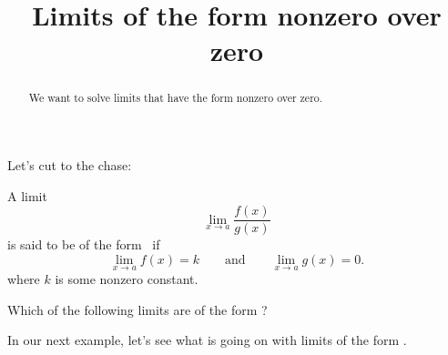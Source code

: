 \documentclass{ximera}
\title[Dig-In:]{Limits of the form nonzero over zero}
\begin{document}
\begin{abstract}
  We want to solve limits that have the form nonzero over zero.
\end{abstract}

\maketitle

Let's cut to the chase:

\begin{definition}
  A limit
  \[
  \lim_{x\to a} \frac{f(x)}{g(x)}
  \]
  is said to be of the form \numOverZero\ if
  \[
  \lim_{x\to a} f(x) = k\qquad\text{and}\qquad \lim_{x\to a} g(x) =0.
  \]
  where $k$ is some nonzero constant.
\end{definition}

\begin{question}
  Which of the following limits are of the form \numOverZero?
  \begin{selectAll}
  \end{selectAll}
\end{question}

In our next example, let's see what is going on with limits of the
form \numOverZero.
\end{document}
